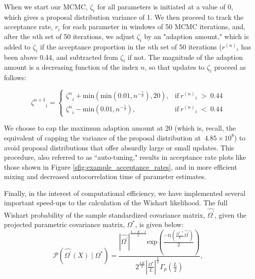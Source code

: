 \documentclass[12pt]{article}
\newcommand{\identifyadmixsource}[1]{{#1^{*}}}
\begin{document}
When we start our MCMC, $\zeta_i$ for all parameters is initiated at a value of 0, which gives a proposal distribution variance of 1.  We then proceed to track the acceptance rate, $r_i$ for each parameter in windows of 50 MCMC iterations, and, after the $n$th set of 50 iterations, we adjust $\zeta_i$ by an "adaption amount," which is added to $\zeta_i$ if the acceptance proportion in the $n$th set of 50 iterations (${r^{(n)}}_i$ has been above 0.44, and subtracted from $\zeta_i$ if not.  The magnitude of the adaption amount is a decreasing function of the index $n$, so that updates to $\zeta_i$ proceed as follows:

\begin{equation}
{\zeta^{n+1}}_i =
\begin{cases}
{\zeta^{n}}_i + \text{min}(\text{min}(0.01,n^{-\frac{1}{2}}),20), & \text{if} \: {r^{(n)}}_i \; > \; 0.44 \\
{\zeta^{n}}_i - \text{min}(0.01,n^{-\frac{1}{2}}), & \text{if} \: {r^{(n)}}_i \; < \; 0.44
\end{cases}
\label{eq:adpative_mcmc}
\end{equation}

We choose to cap the maximum adaption amount at 20 (which is, recall, the equivalent of capping the variance of the proposal distribution at $~4.85 \times 10^8$) to avoid proposal distributions that offer absurdly large or small updates.  This procedure, also referred to as ``auto-tuning," results in acceptance rate plots like those shown in Figure \ref{sfig:example_acceptance_rates}, and in more efficient mixing and decreased autocorrelation time of parameter estimates.

Finally, in the interest of computational efficiency, we have implemented several important speed-ups to the calculation of the Wishart likelihood.  The full Wishart probability of the sample standardized covariance matrix, $\widehat{\Omega^{\prime}}$, given the projected parametric covariance matrix, $\identifyadmixsource{\Omega}$, is given below:
\begin{equation}
\mathcal{P}(\widehat{\Omega^{\prime}}(X) \; | \; \identifyadmixsource{\Omega}) = \frac{|\widehat{\Omega^{\prime}}|^{ \frac{L - K - 1}{2} } \text{exp} \left(  \frac{-\text{tr}(\frac{\identifyadmixsource{\Omega}^{-1}}{L}\widehat{\Omega^{\prime}})}{2}	\right) }	
									{2^{\frac{LK}{2}}  |\frac{\identifyadmixsource{\Omega}}{L}|^{\frac{L}{2}}  \Gamma_{p}\!\left(  \frac{L}{2} \right)	},
\label{eq:full_wishart_lnl}
\end{equation}
\end{document}
